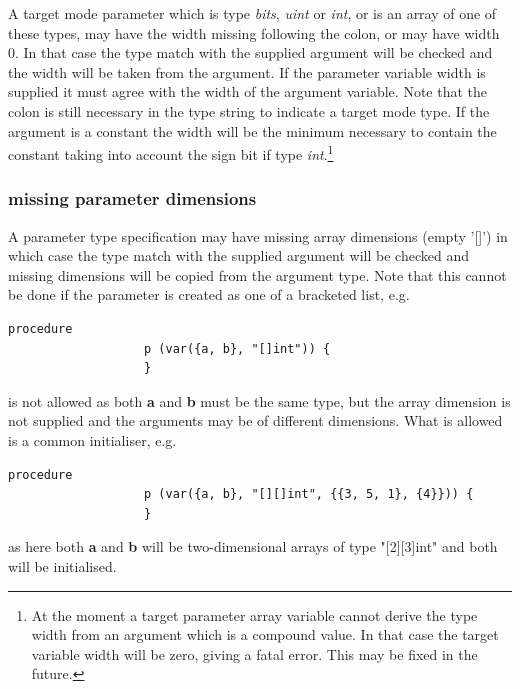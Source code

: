                 A target mode parameter which is type {\em bits}, {\em uint} or
                {\em int}, or is an array of one of these types, may have the
                width missing following the colon, or may have width 0. In that
                case the type match with the supplied argument will be checked
                and the width will be taken from the argument. If the parameter
                variable width is supplied it must agree with the width of the
                argument variable. Note that the colon is still necessary in
                the type string to indicate a target mode type. If the argument
                is a constant the width will be the minimum necessary to
                contain the constant taking into account the sign bit if type
                {\em int}.\footnote{At the moment a target parameter array
                variable cannot derive the type width from an argument which is
                a compound value. In that case the target variable width
                will be zero, giving a fatal error. This may be fixed in the
                future.}        

            \subsubsection{missing parameter dimensions}

                A parameter type specification may have missing array
                dimensions (empty '[]') in which case the type match with the
                supplied argument will be checked and missing dimensions will
                be copied from the argument type. Note that this cannot be
                done if the parameter is created as one of a bracketed list,
                e.g.
                \begin{lstlisting}[gobble=16, language=threepl]
                   procedure
                   p (var({a, b}, "[]int")) {
                   }
                \end{lstlisting}
                is not allowed as both {\bf a} and {\bf b} must be the same type,
                but the array dimension is not supplied and the arguments may be of
                different dimensions. What is allowed is a common initialiser, e.g.
                \begin{lstlisting}[gobble=16, language=threepl]
                   procedure
                   p (var({a, b}, "[][]int", {{3, 5, 1}, {4}})) {
                   }
                \end{lstlisting}
                as here both {\bf a} and {\bf b} will be two-dimensional arrays
                of type "[2][3]int" and both will be initialised.
                
